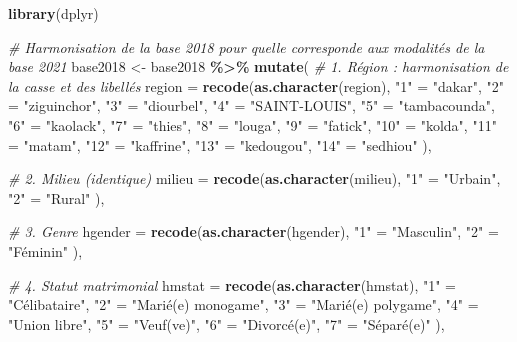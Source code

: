 \documentclass[
]{article}
\newenvironment{Shaded}{\begin{snugshade}}{\end{snugshade}}
\newcommand{\AttributeTok}[1]{\textcolor[rgb]{0.13,0.29,0.53}{#1}}
\newcommand{\CommentTok}[1]{\textcolor[rgb]{0.56,0.35,0.01}{\textit{#1}}}
\newcommand{\FunctionTok}[1]{\textcolor[rgb]{0.13,0.29,0.53}{\textbf{#1}}}
\newcommand{\NormalTok}[1]{#1}
\newcommand{\OtherTok}[1]{\textcolor[rgb]{0.56,0.35,0.01}{#1}}
\newcommand{\SpecialCharTok}[1]{\textcolor[rgb]{0.81,0.36,0.00}{\textbf{#1}}}
\newcommand{\StringTok}[1]{\textcolor[rgb]{0.31,0.60,0.02}{#1}}
\begin{document}
\begin{Shaded}
\begin{Highlighting}[]
\FunctionTok{library}\NormalTok{(dplyr)}

\CommentTok{\# Harmonisation de la base 2018 pour qu\textquotesingle{}elle corresponde aux modalités de la base 2021}
\NormalTok{base2018 }\OtherTok{\textless{}{-}}\NormalTok{ base2018 }\SpecialCharTok{\%\textgreater{}\%}
  \FunctionTok{mutate}\NormalTok{(}
    \CommentTok{\# 1. Région : harmonisation de la casse et des libellés}
    \AttributeTok{region =} \FunctionTok{recode}\NormalTok{(}\FunctionTok{as.character}\NormalTok{(region),}
      \StringTok{"1"}  \OtherTok{=} \StringTok{"dakar"}\NormalTok{,}
      \StringTok{"2"}  \OtherTok{=} \StringTok{"ziguinchor"}\NormalTok{,}
      \StringTok{"3"}  \OtherTok{=} \StringTok{"diourbel"}\NormalTok{,}
      \StringTok{"4"}  \OtherTok{=} \StringTok{"SAINT{-}LOUIS"}\NormalTok{,}
      \StringTok{"5"}  \OtherTok{=} \StringTok{"tambacounda"}\NormalTok{,}
      \StringTok{"6"}  \OtherTok{=} \StringTok{"kaolack"}\NormalTok{,}
      \StringTok{"7"}  \OtherTok{=} \StringTok{"thies"}\NormalTok{,}
      \StringTok{"8"}  \OtherTok{=} \StringTok{"louga"}\NormalTok{,}
      \StringTok{"9"}  \OtherTok{=} \StringTok{"fatick"}\NormalTok{,}
      \StringTok{"10"} \OtherTok{=} \StringTok{"kolda"}\NormalTok{,}
      \StringTok{"11"} \OtherTok{=} \StringTok{"matam"}\NormalTok{,}
      \StringTok{"12"} \OtherTok{=} \StringTok{"kaffrine"}\NormalTok{,}
      \StringTok{"13"} \OtherTok{=} \StringTok{"kedougou"}\NormalTok{,}
      \StringTok{"14"} \OtherTok{=} \StringTok{"sedhiou"}
\NormalTok{    ),}
    
    \CommentTok{\# 2. Milieu (identique)}
    \AttributeTok{milieu =} \FunctionTok{recode}\NormalTok{(}\FunctionTok{as.character}\NormalTok{(milieu),}
      \StringTok{"1"} \OtherTok{=} \StringTok{"Urbain"}\NormalTok{,}
      \StringTok{"2"} \OtherTok{=} \StringTok{"Rural"}
\NormalTok{    ),}
    
    \CommentTok{\# 3. Genre}
    \AttributeTok{hgender =} \FunctionTok{recode}\NormalTok{(}\FunctionTok{as.character}\NormalTok{(hgender),}
      \StringTok{"1"} \OtherTok{=} \StringTok{"Masculin"}\NormalTok{,}
      \StringTok{"2"} \OtherTok{=} \StringTok{"Féminin"}
\NormalTok{    ),}
    
    \CommentTok{\# 4. Statut matrimonial}
    \AttributeTok{hmstat =} \FunctionTok{recode}\NormalTok{(}\FunctionTok{as.character}\NormalTok{(hmstat),}
      \StringTok{"1"} \OtherTok{=} \StringTok{"Célibataire"}\NormalTok{,}
      \StringTok{"2"} \OtherTok{=} \StringTok{"Marié(e) monogame"}\NormalTok{,}
      \StringTok{"3"} \OtherTok{=} \StringTok{"Marié(e) polygame"}\NormalTok{,}
      \StringTok{"4"} \OtherTok{=} \StringTok{"Union libre"}\NormalTok{,}
      \StringTok{"5"} \OtherTok{=} \StringTok{"Veuf(ve)"}\NormalTok{,}
      \StringTok{"6"} \OtherTok{=} \StringTok{"Divorcé(e)"}\NormalTok{,}
      \StringTok{"7"} \OtherTok{=} \StringTok{"Séparé(e)"}
\NormalTok{    ),}
    

\end{Highlighting}
\end{Shaded}
\end{document}
